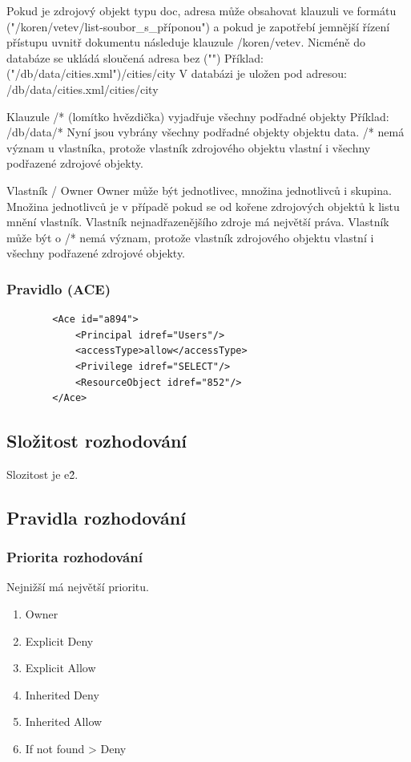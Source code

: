 Pokud je zdrojový objekt typu doc, adresa může obsahovat klauzuli ve formátu ("/koren/vetev/list-soubor\_s\_příponou") a pokud je zapotřebí jemnější řízení přístupu uvnitř dokumentu následuje klauzule /koren/vetev. Nicméně do databáze se ukládá sloučená adresa bez ("")
Příklad:  ("/db/data/cities.xml")/cities/city
V databázi je uložen pod adresou: /db/data/cities.xml/cities/city

Klauzule /* (lomítko hvězdička) vyjadřuje všechny podřadné objekty
Příklad:  /db/data/*
Nyní jsou vybrány všechny podřadné objekty objektu data.
/* nemá význam u vlastníka, protože vlastník zdrojového objektu vlastní i všechny podřazené zdrojové objekty.

Vlastník / Owner
Owner může být jednotlivec, množina jednotlivců i skupina.
Množina jednotlivců je v případě pokud se od kořene zdrojových objektů k listu mnění vlastník. Vlastník nejnadřazenějšího zdroje má největší práva. Vlastník může být o 
/* nemá význam, protože vlastník zdrojového objektu vlastní i všechny podřazené zdrojové objekty.

\subsubsection{Pravidlo (ACE)}
\begin{verbatim}
        <Ace id="a894">
            <Principal idref="Users"/>
            <accessType>allow</accessType>
            <Privilege idref="SELECT"/>
            <ResourceObject idref="852"/>
        </Ace>
\end{verbatim}

\subsection{Složitost rozhodování}
Slozitost je e\^2.


\subsection{Pravidla rozhodování}
\subsubsection{Priorita rozhodování}

Nejnižší má největší prioritu.

\begin{enumerate}
\item Owner
\item Explicit Deny
\item Explicit Allow
\item Inherited Deny
\item Inherited Allow
\item If not found > Deny
\end{enumerate}
